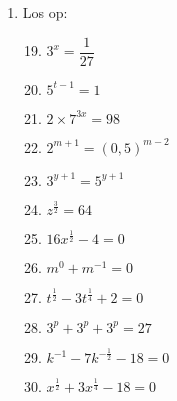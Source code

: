 \begin{eocexercises}{}
\begin{enumerate}[label=\textbf{\arabic*}., itemsep=5pt]
\item Los op:
    \begin{multicols}{2}
      \begin{enumerate}[label=\textbf{(\alph*)}, itemsep=7pt]
        \setcounter{enumi}{18}
      \item $ 3^x = \dfrac{1}{27} $
      \item $ 5^{t-1} = 1 $
      \item $ 2 \times 7^{3x} = 98 $
      \item $ 2^{m+1} = (0,5)^{m-2}$
      \item $ 3^{y+1} = 5^{y+1} $
      \item $ z^{\frac{3}{2}} = 64 $
      \item $ 16x^{\frac{1}{2}} - 4 = 0 $
      \item $ m^0 + m^{-1} = 0 $
      \item $ t^{\frac{1}{2}} - 3t^{\frac{1}{4}} + 2 = 0 $
      \item $ 3^p + 3^p + 3^p = 27 $
      \item $ k^{-1} - 7k^{-\frac{1}{2}} -18 = 0 $
      \item $ x^{\frac{1}{2}}+3x^{\frac{1}{4}}-18 = 0 $
      \end{enumerate}
    \end{multicols}
  \end{enumerate}
\end{eocexercises}


